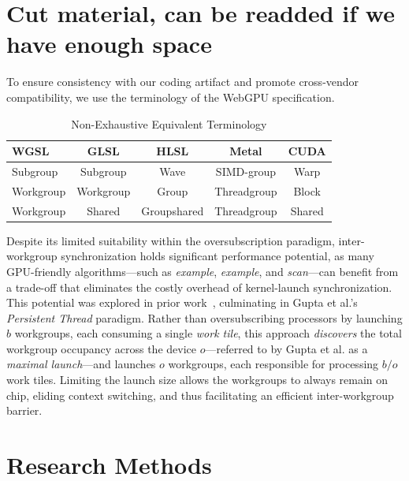 \documentclass[sigconf]{acmart}
\begin{document}
\section{Cut material, can be readded if we have enough space}

To ensure consistency with our coding artifact and promote cross-vendor compatibility, we use the terminology of the WebGPU specification.
\setlength{\tabcolsep}{3pt}
\begin{table}[h]
  \centering
  \caption{Non-Exhaustive Equivalent Terminology}
  \label{tab:terminology}
  \begin{tabular}{lcccc}
    \toprule
    \textbf{WGSL}   & \textbf{GLSL}  & \textbf{HLSL}   & \textbf{Metal}     & \textbf{CUDA} \\ \midrule
    Subgroup        & Subgroup       & Wave            & SIMD-group         & Warp          \\
    Workgroup       & Workgroup      & Group           & Threadgroup        & Block         \\
    Workgroup       & Shared         & Groupshared     & Threadgroup        & Shared        \\ \bottomrule
  \end{tabular}
\end{table}

Despite its limited suitability within the oversubscription paradigm, inter-workgroup synchronization holds significant performance potential, as many GPU-friendly algorithms—such as \emph{example}, \emph{example}, and \emph{scan}---can benefit from a trade-off that eliminates the costly overhead of kernel-launch synchronization. This potential was explored in prior work~\cite{}, culminating in Gupta et al.’s~\cite{} \emph{Persistent Thread} paradigm. Rather than oversubscribing processors by launching $b$ workgroups, each consuming a single \emph{work tile}, this approach \emph{discovers} the total workgroup occupancy across the device $o$---referred to by Gupta et al. as a \emph{maximal launch}---and launches $o$ workgroups, each responsible for processing $b/o$ work tiles. Limiting the launch size allows the workgroups to always remain on chip, eliding context switching, and thus facilitating an efficient inter-workgroup barrier.

\begin{acks}
\end{acks}




\appendix

\section{Research Methods}
\end{document}
